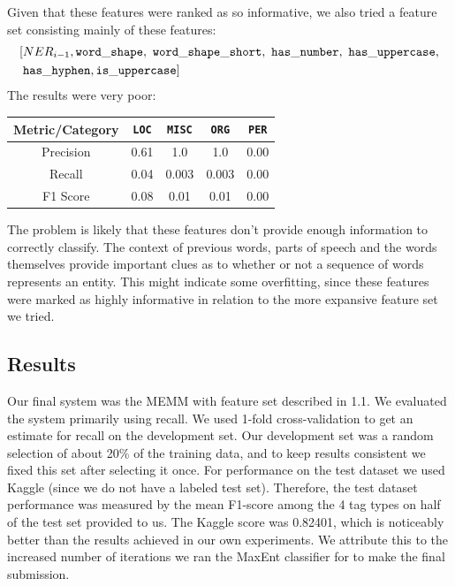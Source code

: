 \documentclass[12pt]{article}
\begin{document}
Given that these features were ranked as so informative, we also tried a feature set consisting mainly of these features: 
\begin{equation*}
\begin{split}
[
&NER_{i - 1}, {\tt word\_shape,\ word\_shape\_short,\ has\_number,\ has\_uppercase,}\\
&{\tt has\_hyphen, is\_uppercase}
]
\end{split}
\end{equation*}
The results were very poor:
\begin{center}
	\begin{tabular}{|c|c|c|c|c|}
		\hline
		\textbf{Metric/Category} & {\tt LOC} & {\tt MISC} & {\tt ORG} & {\tt PER}\\
		\hline
		Precision & 0.61 & 1.0 & 1.0 & 0.00\\
		\hline
		Recall & 0.04 & 0.003 & 0.003 & 0.00\\
		\hline
		F1 Score & 0.08 & 0.01 & 0.01 & 0.00\\
		\hline
	\end{tabular}
\end{center}
The problem is likely that these features don't provide enough information to correctly classify. The context of previous words, parts of speech and the words themselves provide important clues as to whether or not a sequence of words represents an entity. This might indicate some overfitting, since these features were marked as highly informative in relation to the more expansive feature set we tried. 
\subsection{Results}
Our final system was the MEMM with feature set described in 1.1. We evaluated the system primarily using recall. We used 1-fold cross-validation to get an estimate for recall on the development set. Our development set was a random selection of about 20\% of the training data, and to keep results consistent we fixed this set after selecting it once. For performance on the test dataset we used Kaggle (since we do not have a labeled test set). Therefore, the test dataset performance was measured by the mean F1-score among the 4 tag types on half of the test set provided to us. The Kaggle score was 0.82401, which is noticeably better than the results achieved in our own experiments. We attribute this to the increased number of iterations we ran the MaxEnt classifier for to make the final submission. 
\end{document}
